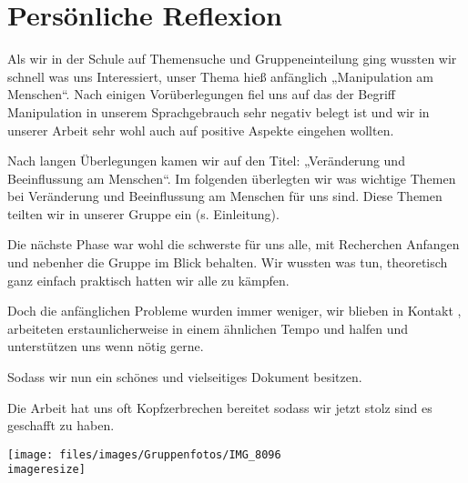 \chapter{Persönliche Reflexion}
\label{sec:reflexion}

Als wir in der Schule auf Themensuche und Gruppeneinteilung ging wussten wir schnell was uns
Interessiert, unser Thema hieß anfänglich „Manipulation am Menschen“. Nach einigen Vorüberlegungen
fiel uns auf das der Begriff Manipulation in unserem Sprachgebrauch sehr negativ belegt ist und wir
in unserer Arbeit sehr wohl auch auf positive Aspekte eingehen wollten.

Nach langen Überlegungen kamen wir auf den Titel: „Veränderung und Beeinflussung am Menschen“. Im
folgenden überlegten wir was wichtige Themen bei Veränderung und Beeinflussung am Menschen für uns
sind. Diese Themen teilten wir in unserer Gruppe ein (s. Einleitung).

Die nächste Phase war wohl die schwerste für uns alle, mit Recherchen Anfangen und nebenher die
Gruppe im Blick behalten. Wir wussten was tun, theoretisch ganz einfach praktisch hatten wir alle
zu kämpfen.

Doch die anfänglichen Probleme wurden immer weniger, wir blieben in Kontakt , arbeiteten
erstaunlicherweise in einem ähnlichen Tempo und halfen und unterstützen uns wenn nötig gerne.

Sodass wir nun ein schönes und vielseitiges Dokument besitzen.

Die Arbeit hat uns oft Kopfzerbrechen bereitet sodass wir jetzt stolz sind es geschafft zu haben.

\begin{figurewrapper}
	\texttt{[image: files/images/Gruppenfotos/IMG\_8096\\imageresize]}
	\label{fig:group_picture}
\end{figurewrapper}

